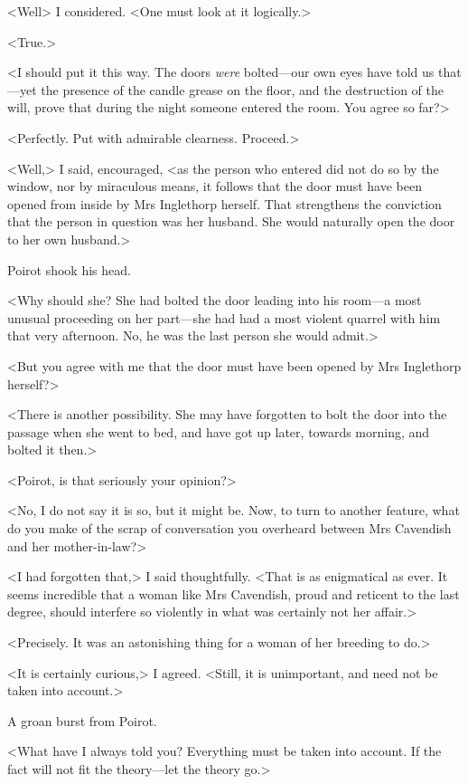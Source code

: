  <Well\longdash> I considered. <One must look at it logically.> 

 <True.> 

 <I should put it this way. The doors \emph{were} bolted—our own eyes have told us that—yet the presence of the candle grease on the floor, and the destruction of the will, prove that during the night someone entered the room. You agree so far?> 

 <Perfectly. Put with admirable clearness. Proceed.> 

 <Well,> I said, encouraged, <as the person who entered did not do so by the window, nor by miraculous means, it follows that the door must have been opened from inside by Mrs Inglethorp herself. That strengthens the conviction that the person in question was her husband. She would naturally open the door to her own husband.> 

 Poirot shook his head. 

 <Why should she? She had bolted the door leading into his room—a most unusual proceeding on her part—she had had a most violent quarrel with him that very afternoon. No, he was the last person she would admit.> 

 <But you agree with me that the door must have been opened by Mrs Inglethorp herself?> 

 <There is another possibility. She may have forgotten to bolt the door into the passage when she went to bed, and have got up later, towards morning, and bolted it then.> 

 <Poirot, is that seriously your opinion?> 

 <No, I do not say it is so, but it might be. Now, to turn to another feature, what do you make of the scrap of conversation you overheard between Mrs Cavendish and her mother-in-law?> 

 <I had forgotten that,> I said thoughtfully. <That is as enigmatical as ever. It seems incredible that a woman like Mrs Cavendish, proud and reticent to the last degree, should interfere so violently in what was certainly not her affair.> 

 <Precisely. It was an astonishing thing for a woman of her breeding to do.> 

 <It is certainly curious,> I agreed. <Still, it is unimportant, and need not be taken into account.> 

 A groan burst from Poirot. 

 <What have I always told you? Everything must be taken into account. If the fact will not fit the theory—let the theory go.> 

